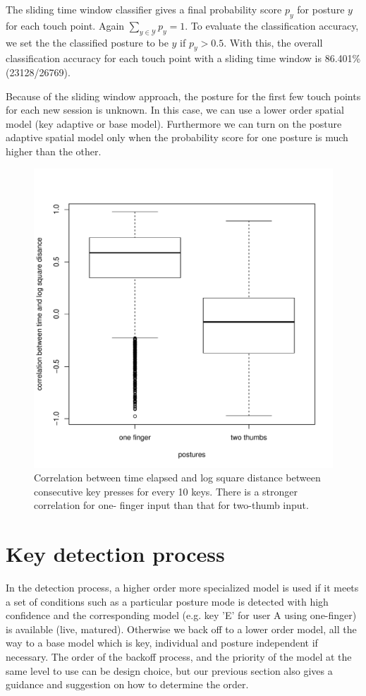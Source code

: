 \documentclass{sigchi}
\begin{document}
The sliding time window classifier gives a final probability score $p_y$ for posture
$y$ for each touch point. Again $\displaystyle\sum_{y\in \mathcal{Y}}p_y = 1$. To evaluate the classification accuracy, we set the the
classified posture to be $y$ if $p_y > 0.5$. With this, the overall classification 
accuracy for each touch point with a sliding time window
is 86.401\% (23128/26769).

Because of the sliding window approach, the posture for the first few touch points  
for each new session is unknown. In this case, we can use a lower order spatial 
model (key adaptive or base model). Furthermore  we can turn on the posture 
adaptive spatial model only when the probability score for one posture is much 
higher than the other.

\begin{figure}[tb]
  \centering
  \includegraphics[width=1\columnwidth]{figures/boxplot.pdf}
  \caption{Correlation between time elapsed and log square distance between
  consecutive key presses for every 10 keys. There is a stronger correlation for
  one- finger input than that for two-thumb input.}
  \label{fig:boxplot}
\end{figure}

\section{Key detection process}\label{sec:key-detection-process}
In the detection process, a higher order more specialized model is used if it
meets a set of conditions such as a particular posture mode is detected with high 
confidence and the corresponding model (e.g. key 'E' for user A using
one-finger) is available (live, matured).
Otherwise we back off to a lower order model, all the way to a base model which 
is key, individual and posture independent if necessary. The order of the
backoff process, and the priority of the model at the same level to use can be
design choice, but our previous section also gives a guidance and suggestion on
how to determine the order.
\end{document}
